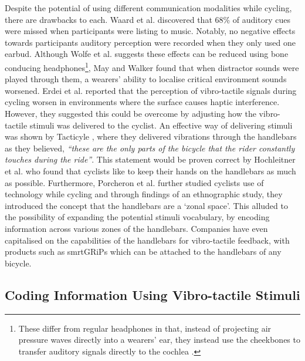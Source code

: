 \documentclass{interim}
\begin{document}
Despite the potential of using different communication modalities while cycling, there are drawbacks to each. Waard et al. \cite{DEWAARD2011626} discovered that 68\% of auditory cues were missed when participants were listing to music. Notably, no negative effects towards participants auditory perception were recorded when they only used one earbud. Although Wolfe et al. \cite{wolfe2016distracted} suggests these effects can be reduced using bone conducing headphones\footnote{These differ from regular headphones in that, instead of projecting air pressure waves directly into a wearers' ear, they instead use the cheekbones to transfer auditory signals directly to the cochlea \cite{littler1952hearing}.}, May and Walker \cite{may2017effects} found that when distractor sounds were played through them, a wearers' ability to localise critical environment sounds worsened. Erdei et al. \cite{erdei2020comparing, doi:10.1080/15389588.2021.1985113} reported that the perception of vibro-tactile signals during cycling worsen in environments where the surface causes haptic interference. However, they suggested this could be overcome by adjusting how the vibro-tactile stimuli was delivered to the cyclist. An effective way of delivering stimuli was shown by Tacticyle \cite{10.1145/2371574.2371631}, where they delivered vibrations through the handlebars as they believed, \textit{“these are the only parts of the bicycle that the rider constantly touches during the ride”}. This statement would be proven correct by Hochleitner et al. \cite{10.1145/3152832.3152871} who found that cyclists like to keep their hands on the handlebars as much as possible. Furthermore, Porcheron et al. \cite{10.1145/3544548.3580971} further studied cyclists use of technology while cycling and through findings of an ethnographic study, they introduced the concept that the handlebars are a ‘zonal space’. This alluded to the possibility of expanding the potential stimuli vocabulary, by encoding information across various zones of the handlebars. Companies have even capitalised on the capabilities of the handlebars for vibro-tactile feedback, with products such as smrtGRiPs \cite{smartgrips} which can be attached to the handlebars of any bicycle.


\subsection{Coding Information Using Vibro-tactile Stimuli}
\end{document}
